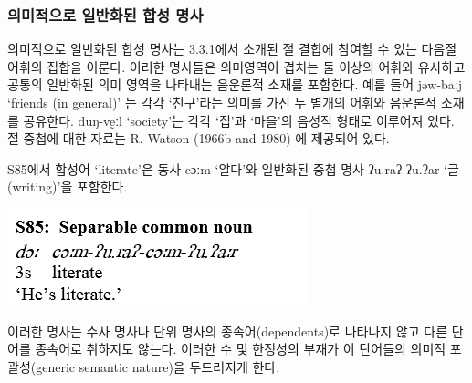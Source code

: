 \subsubsection{의미적으로 일반화된 합성 명사}
의미적으로 일반화된 합성 명사는 3.3.1에서 소개된 절 결합에 참여할 수 있는 다음절 어휘의 집합을 이룬다.
이러한 명사들은 의미영역이 겹치는 둘 이상의 어휘와 유사하고 공통의 일반화된 의미 영역을 나타내는 음운론적 소재를 포함한다. 예를 들어 jəw-baːj `friends (in general)' 는 각각 `친구'라는 의미를 가진 두 별개의 어휘와 음운론적 소재를 공유한다. duŋ-vḛːl `society'는 각각 `집'과 `마을'의 음성적 형태로 이루어져 있다.
절 중첩에 대한 자료는 R. Watson (1966b and 1980) 에 제공되어 있다.

S85에서 합성어 `literate'은 동사 cɔːm `알다'와 일반화된 중첩 명사 ʔu.raʔ-ʔu.ʔar `글(writing)'을 포함한다.

\includegraphics{Pacoh/src/PacohS85.png}

이러한 명사는 수사 명사나 단위 명사의 종속어(dependents)로 나타나지 않고 다른 단어를 종속어로 취하지도 않는다. 이러한 수 및 한정성의 부재가 이 단어들의 의미적 포괄성(generic semantic nature)을 두드러지게 한다.